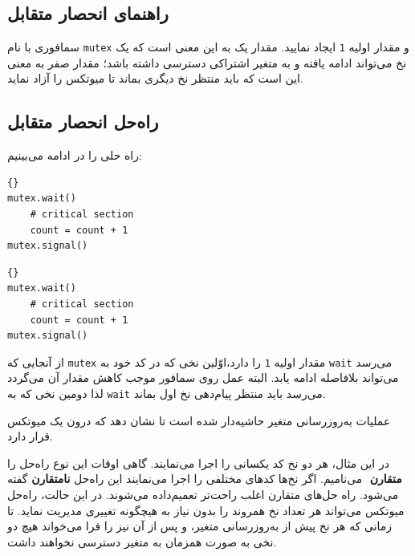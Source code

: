 \documentclass{book}
\newcommand{\clearemptydoublepage}{\newpage\cleardoublepage}
\begin{document}
\clearemptydoublepage
\subsection{راهنمای انحصار متقابل}

    سمافوری با نام \texttt{mutex} و مقدار اولیه \texttt{1} ایجاد نمایید. 
    مقدار یک به این معنی است که یک نخ می‌تواند ادامه یافته و به متغیر اشتراکی دسترسی داشته باشد؛ مقدار صفر به معنی این است که 
    باید منتظر نخ دیگری بماند تا میوتکس را آزاد نماید. 


\clearemptydoublepage
\subsection{  راه‌حل انحصار متقابل}

    راه حلی را در ادامه می‌بینیم:

\begin{latin}
\begin{minipage}[t]{2in}
\begin{latin}
\begin{lstlisting}[title=\rl{نخ \lr{A}}]{}
mutex.wait()
    # critical section
    count = count + 1
mutex.signal()
\end{lstlisting}
\end{latin}
\end{minipage}
\hfill
\begin{minipage}[t]{2in}
\begin{latin}
\begin{lstlisting}[title=\rl{نخ \lr{B}}]{}
mutex.wait()
    # critical section
    count = count + 1
mutex.signal()
\end{lstlisting}
\end{latin}
\end{minipage}
\end{latin}

    از آنجایی که \texttt{mutex} مقدار اولیه  \texttt{1} را دارد،اوّلین نخی که در کد خود به \texttt{wait} می‌رسد می‌تواند بلافاصله ادامه یابد.
    البته عمل  روی سمافور موجب کاهش مقدار آن می‌گردد لذا دومین نخی که به  \texttt{wait} می‌رسد باید منتظر پیام‌دهی نخ اول بماند. 

    عملیات به‌روزرسانی متغیر حاشیه‌دار شده است تا نشان دهد که درون یک میوتکس  قرار دارد. 
    
    در این مثال، هر دو نخ کد یکسانی را اجرا می‌نمایند. گاهی اوقات این نوع راه‌حل را \textbf{متقارن} ‌
    می‌نامیم. اگر نخ‌ها کدهای مختلفی را اجرا می‌نمایند این راه‌حل \textbf{نامتقارن}
    گفته می‌شود. راه حل‌های متقارن اغلب راحت‌تر تعمیم‌داده می‌شوند. در این حالت، راه‌حل  میوتکس می‌تواند هر تعداد نخ همروند را بدون 
    نیاز به هیچگونه تغییری مدیریت نماید. تا زمانی که هر نخ پیش از به‌روزرسانی متغیر،    و پس از آن نیز    
    را فرا می‌خواند هیچ دو نخی به صورت همزمان به متغیر  دسترسی نخواهند داشت.
\end{document}
